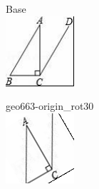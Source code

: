 \documentclass[12pt]{article}
\begin{document}
\begin{center}
\begin{minipage}{0.32\textwidth}\centering
Base\\
\includegraphics[width=0.95\linewidth]{out_rommath_origin/items/geo663-origin/assets/figure.png}
\end{minipage}
\hfill\begin{minipage}{0.32\textwidth}\centering
geo663-origin\_rot30\\
\includegraphics[width=0.95\linewidth]{out_rommath_origin/items/geo663-origin/assets/figure_rot30.png}

\end{minipage}
\end{center}
\end{document}
